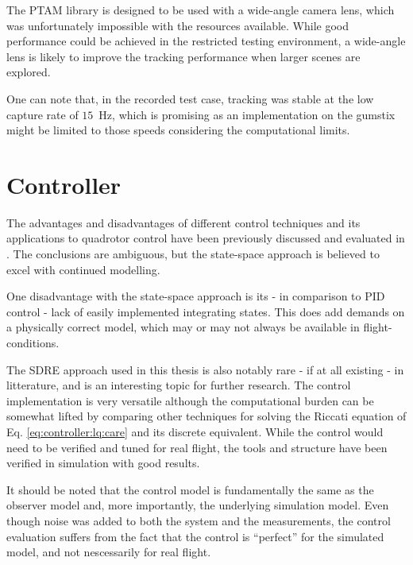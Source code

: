         The PTAM library is designed to be used with a wide-angle camera lens,
        which was unfortunately impossible with the resources available.
        While good performance could be achieved in the restricted testing
        environment, a wide-angle lens is likely to improve the tracking
        performance when larger scenes are explored.

        One can note that, in the recorded test case, tracking was stable
        at the low capture rate of $15$~Hz, which is promising as an implementation
        on the gumstix might be limited to those speeds considering the
        computational limits.

    \section{Controller}
        The advantages and disadvantages of different control techniques
        and its applications to quadrotor control
        have been previously discussed and evaluated in \citep{bouabdallah04pid}.
        The conclusions are ambiguous, but the state-space approach is believed to
        excel with continued modelling.

        One disadvantage with the state-space approach is its - in comparison
        to PID control - lack of easily implemented integrating states.
        This does add demands on a physically correct model, which may
        or may not always be available in flight-conditions.

        The SDRE approach used in this thesis is also notably rare - if at all existing - in litterature,
        and is an interesting topic for further research.
        The control implementation is very versatile although the computational
        burden can be somewhat lifted by comparing other techniques for solving
        the Riccati equation of Eq. \ref{eq:controller:lq:care} and its discrete equivalent.
        While the control would need to be verified and tuned for real flight,
        the tools and structure have been verified in simulation with good results.

        It should be noted that the control model is fundamentally the same
        as the observer model and, more importantly, the underlying simulation
        model. Even though noise was added to both the system and the measurements,
        the control evaluation suffers from the fact that the control is ``perfect'' for the
        simulated model, and not nescessarily for real flight.

